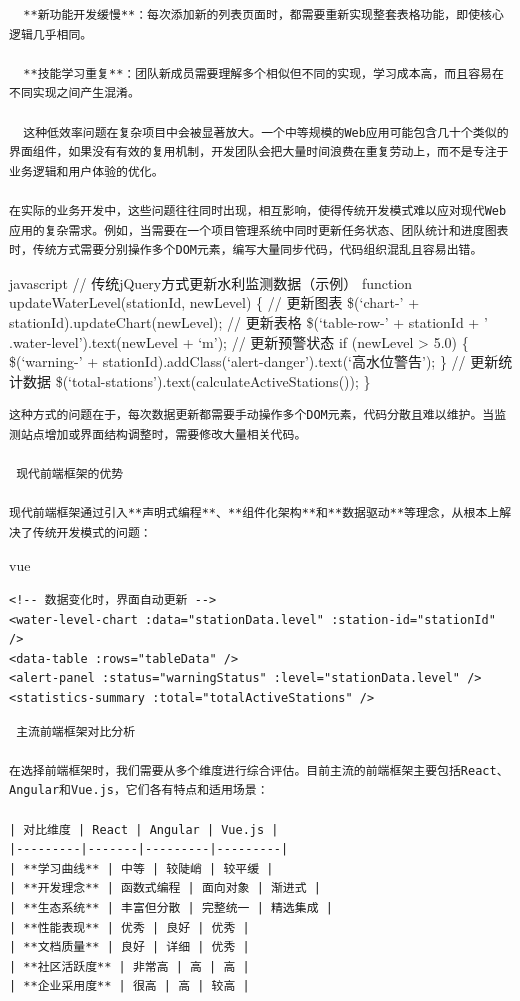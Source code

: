 {{\begin{lstlisting}
  **新功能开发缓慢**：每次添加新的列表页面时，都需要重新实现整套表格功能，即使核心逻辑几乎相同。

  **技能学习重复**：团队新成员需要理解多个相似但不同的实现，学习成本高，而且容易在不同实现之间产生混淆。

  这种低效率问题在复杂项目中会被显著放大。一个中等规模的Web应用可能包含几十个类似的界面组件，如果没有有效的复用机制，开发团队会把大量时间浪费在重复劳动上，而不是专注于业务逻辑和用户体验的优化。

在实际的业务开发中，这些问题往往同时出现，相互影响，使得传统开发模式难以应对现代Web应用的复杂需求。例如，当需要在一个项目管理系统中同时更新任务状态、团队统计和进度图表时，传统方式需要分别操作多个DOM元素，编写大量同步代码，代码组织混乱且容易出错。
\end{lstlisting}

javascript // 传统jQuery方式更新水利监测数据（示例） function updateWaterLevel(stationId, newLevel) \{ // 更新图表 \$(`chart-' + stationId).updateChart(newLevel); // 更新表格 \$(`table-row-' + stationId + ' .water-level').text(newLevel + `m'); // 更新预警状态 if (newLevel \textgreater{} 5.0) \{ \$(`warning-' + stationId).addClass(`alert-danger').text(`高水位警告'); \} // 更新统计数据 \$(`total-stations').text(calculateActiveStations()); \}

\begin{lstlisting}
这种方式的问题在于，每次数据更新都需要手动操作多个DOM元素，代码分散且难以维护。当监测站点增加或界面结构调整时，需要修改大量相关代码。

 现代前端框架的优势

现代前端框架通过引入**声明式编程**、**组件化架构**和**数据驱动**等理念，从根本上解决了传统开发模式的问题：
\end{lstlisting}

vue

\begin{verbatim}
<!-- 数据变化时，界面自动更新 -->
<water-level-chart :data="stationData.level" :station-id="stationId" />
<data-table :rows="tableData" />
<alert-panel :status="warningStatus" :level="stationData.level" />
<statistics-summary :total="totalActiveStations" />
\end{verbatim}

\begin{lstlisting}
 主流前端框架对比分析

在选择前端框架时，我们需要从多个维度进行综合评估。目前主流的前端框架主要包括React、Angular和Vue.js，它们各有特点和适用场景：

| 对比维度 | React | Angular | Vue.js |
|---------|-------|---------|---------|
| **学习曲线** | 中等 | 较陡峭 | 较平缓 |
| **开发理念** | 函数式编程 | 面向对象 | 渐进式 |
| **生态系统** | 丰富但分散 | 完整统一 | 精选集成 |
| **性能表现** | 优秀 | 良好 | 优秀 |
| **文档质量** | 良好 | 详细 | 优秀 |
| **社区活跃度** | 非常高 | 高 | 高 |
| **企业采用度** | 很高 | 高 | 较高 |


\end{lstlisting}}}
